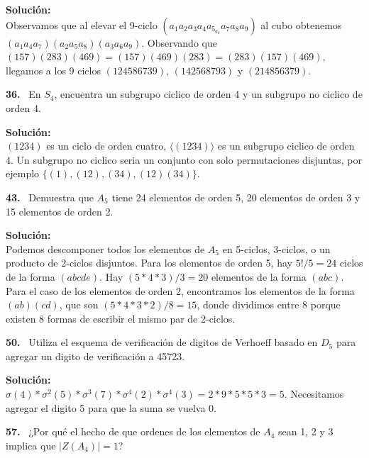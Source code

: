 \documentclass{article}
\newcounter{problem}
\newcounter{solution}
\newcommand\Problem[1]{%
  \stepcounter{problem}%
  \textbf{#1.}~%
  \setcounter{solution}{0}%
}
\newcommand\TheSolution{%
  \textbf{Solución:}\\%
}
\begin{document}
\TheSolution{} Observamos que al elevar el 9-ciclo $(a_1 a_2 a_3 a_4 a_5_ a_6
a_7 a_8 a_9)$ al cubo obtenemos $(a_1 a_4 a_7)(a_2 a_5 a_8)(a_3 a_6 a_9)$.
Observando que $(157)(283)(469) = (157)(469)(283) = (283)(157)(469)$, llegamos
a los 9 ciclos $(124586739)$, $(142568793)$ y $(214856379)$.

\Problem{36} En $S_4$, encuentra un subgrupo ciclico de orden 4 y un subgrupo
no ciclico de orden 4.

\TheSolution{} $(1234)$ es un ciclo de orden cuatro, $\langle(1234)\rangle$ es
un subgrupo ciclico de orden 4. Un subgrupo no ciclico seria un conjunto con
solo permutaciones disjuntas, por ejemplo $\{ (1), (12), (34), (12)(34)\}$.

\Problem{43} Demuestra que $A_5$ tiene 24 elementos de orden 5, 20 elementos
de orden 3 y 15 elementos de orden 2.

\TheSolution{} Podemos descomponer todos los elementos de $A_5$ en 5-ciclos,
3-ciclos, o un producto de 2-ciclos disjuntos. Para los elementos de orden 5,
hay $5! / 5 = 24$ ciclos de la forma $(abcde)$. Hay $(5 * 4 * 3) / 3 = 20$
elementos de la forma $(abc)$. Para el caso de los elementos de orden 2,
encontramos los elementos de la forma $(ab)(cd)$, que son $(5 * 4 * 3 * 2)/8
= 15$, donde dividimos entre 8 porque existen 8 formas de escribir el mismo
par de 2-ciclos.

\Problem{50} Utiliza el esquema de verificación de digitos de Verhoeff basado
en $D_5$ para agregar un digito de verificación a 45723. 

\TheSolution{} $\sigma(4) * \sigma^{2}(5) * \sigma^{3}(7) * \sigma^{4}(2) *
\sigma^{4}(3) = 2 * 9 * 5 * 5 * 3 = 5$. Necesitamos agregar el digito 5 para
que la suma se vuelva 0.

\Problem{57} ¿Por qué el hecho de que ordenes de los elementos de $A_4$ sean
1, 2 y 3 implica que $|Z(A_4)| = 1$?
\end{document}
